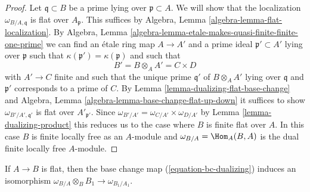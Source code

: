 \begin{proof}
Let $\mathfrak q \subset B$ be a prime lying over $\mathfrak p \subset A$.
We will show that the localization $\omega_{B/A, \mathfrak q}$ is flat
over $A_\mathfrak p$.
This suffices by Algebra, Lemma \ref{algebra-lemma-flat-localization}.
By
Algebra, Lemma \ref{algebra-lemma-etale-makes-quasi-finite-finite-one-prime}
we can find an \'etale ring map $A \to A'$ and a prime
ideal $\mathfrak p' \subset A'$ lying over $\mathfrak p$
such that $\kappa(\mathfrak p') = \kappa(\mathfrak p)$ and
such that
$$
B' = B \otimes_A A' = C \times D
$$
with $A' \to C$ finite and such that the unique prime $\mathfrak q'$
of $B \otimes_A A'$ lying over $\mathfrak q$ and $\mathfrak p'$
corresponds to a prime of $C$. By 
Lemma \ref{lemma-dualizing-flat-base-change}
and Algebra, Lemma \ref{algebra-lemma-base-change-flat-up-down}
it suffices to show $\omega_{B'/A', \mathfrak q'}$
is flat over $A'_{\mathfrak p'}$.
Since $\omega_{B'/A'} = \omega_{C/A'} \times \omega_{D/A'}$
by Lemma \ref{lemma-dualizing-product}
this reduces us to the case where $B$ is finite flat over $A$.
In this case $B$ is finite locally free as an $A$-module
and $\omega_{B/A} = \Hom_A(B, A)$ is the dual finite
locally free $A$-module.
\end{proof}

\begin{lemma}
\label{lemma-dualizing-base-change-of-flat}
If $A \to B$ is flat, then the base change map (\ref{equation-bc-dualizing})
induces an isomorphism $\omega_{B/A} \otimes_B B_1 \to \omega_{B_1/A_1}$.
\end{lemma}

